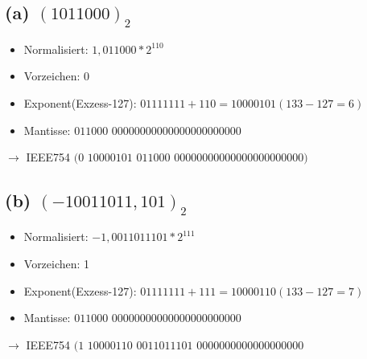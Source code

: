 \documentclass[11pt,a4paper]{article}
\begin{document}
\subsection*{(a) $(1011000)_2$}

\begin{itemize}
    \item Normalisiert: $1,011000 * 2^{110}$
    \item Vorzeichen: $0$
    \item Exponent(Exzess-127): $01111111 + 110 = 10000101 (133 - 127 = 6)$
    \item Mantisse: $011000$ $00000000000000000000000$
\end{itemize}

$\rightarrow$ IEEE754 $(0$ $10000101$ $011000$ $00000000000000000000000)$

\subsection*{(b) $(-10011011,101)_2$}

\begin{itemize}
    \item Normalisiert: $-1,0011011101 * 2^{111}$
    \item Vorzeichen: 1
    \item Exponent(Exzess-127): $01111111+111= 10000110(133 - 127 = 7)$
    \item Mantisse: $011000$ $00000000000000000000000$ \\
\end{itemize}

$\rightarrow$ IEEE754 $(1$ $10000110$ $0011011101$ $0000000000000000000$
\end{document}
